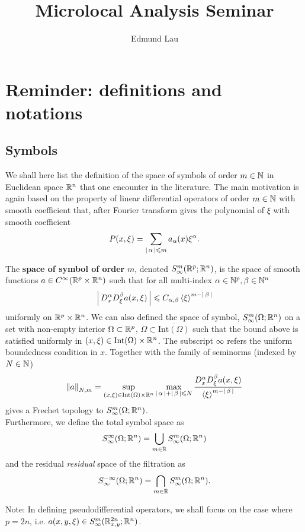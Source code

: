 \documentclass{article}
\title{Microlocal Analysis Seminar }
\author{Edmund Lau}
\begin{document}
\maketitle
\tableofcontents
\pagebreak
\section{Reminder: definitions and notations}
\subsection{Symbols} 
We shall here list the definition of the space of symbols of order $m \in \N$  in Euclidean space $\R^n$ that one encounter in the literature. The main motivation is again based on the property of linear differential operators of order $m \in \N$ with smooth coefficient that, after Fourier transform gives the polynomial of $\xi$ with smooth coefficient 
\begin{align*}
P(x, \xi) = \sum_{\abs{\alpha} \leq m} a_\alpha(x) \xi^\alpha. 
\end{align*}


\begin{fdefinition}
    The \textbf{space of symbol of order} $m$, denoted $S^m_\infty(\R^p; \R^n)$, is the space of smooth functions $a \in C^\infty(\R^p \times \R^n)$ such that for all multi-index $\alpha \in \N^p, \beta \in \N^n$
    \begin{align*}
    \abs{D^\alpha_x D^\beta_\xi a (x, \xi)} \leq C_{\alpha, \beta} \sym[\xi]^{m - \abs{\beta}} 
    \end{align*}
    uniformly on $\R^p \times \R^n$. We can also defined the space of symbol, $S^m_\infty(\Omega; \R^n)$ on a set with non-empty interior $\Omega \subset \R^p$, $\Omega \subset \overline{\mathrm{Int}(\Omega)}$ such that the bound above is satisfied uniformly in $(x, \xi) \in \mathrm{Int}(\Omega) \times \R^n$. The subscript $\infty$ refers the uniform boundedness condition in $x$. Together with the family of seminorms (indexed by $N \in \N$) 
    \begin{align} \label{eq : symbol seminorms} 
    \norm[a]_{N, m} = \sup_{(x, \xi) \in \mathrm{Int}(\Omega) \times \R^n} \max_{\abs{\alpha} + \abs{\beta} \leq N} \frac{D^\alpha_x D^\beta_\xi a(x, \xi)}{\sym[\xi]^{m - \abs{\beta}}} 
    \end{align}
    gives a Frechet topology to $S^m_\infty(\Omega; \R^n)$. \\
    
    Furthermore, we define the total symbol space as
    \[
    S^\infty_\infty(\Omega; \R^n) = \bigcup_{m \in \R} S^{m}_\infty(\Omega; \R^n)
    \]
    and the residual \emph{residual} space of the filtration as 
    \[
    S^{-\infty}_\infty(\Omega; \R^n) = \bigcap_{m \in \R} S^{m}_\infty(\Omega; \R^n). 
    \]
    
    Note: In defining pseudodifferential operators, we shall focus on the case where $p = 2n$, i.e. $a(x, y, \xi) \in S^{m}_\infty(\R^{2n}_{x,y}; \R^n)$. 
\end{fdefinition}
\end{document}
